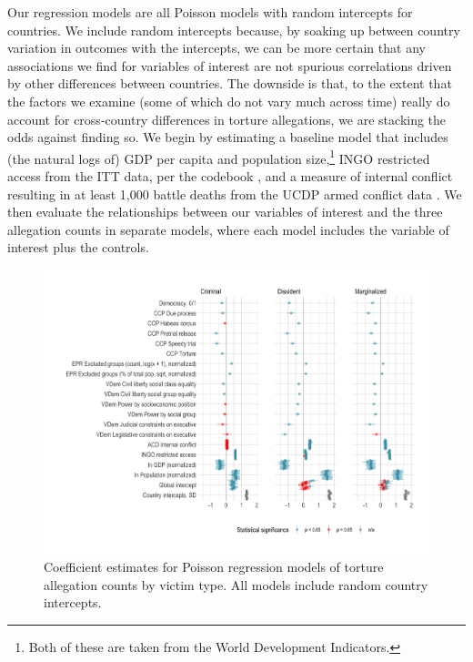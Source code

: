 \documentclass[11pt]{article}
\begin{document}
Our regression models are all Poisson models with random intercepts for countries. We include random intercepts 
because, by soaking up between country variation in outcomes with the intercepts, we can be more certain that any associations we find for variables of interest are not spurious correlations driven by other differences between countries. The downside is that, to the extent that the factors we examine (some of which do not vary much across time) really do account for cross-country differences in torture allegations, we are stacking the odds against finding so. 
We begin by estimating a baseline model that includes (the natural logs of) GDP per capita and population size,\footnote{Both of these are taken from the World Development Indicators.} INGO restricted access from the ITT data, per the codebook \citep[][p.\ 17]{ITTsaguide}, and a measure of internal conflict resulting in at least 1,000 battle deaths from the UCDP armed conflict data \citep{Themner2014}. We then evaluate the relationships between our variables of interest and the three allegation counts in separate models, where each model includes the variable of interest plus the controls. 

\begin{figure}
\begin{center}
\caption{Coefficient estimates for Poisson regression models of torture allegation counts by victim type. All models include random country intercepts.}
\label{fig:coefs}
\includegraphics[width=.99\textwidth]{../output/figures/core-models-coefplot.png}
\end{center}
\end{figure}
\end{document}

